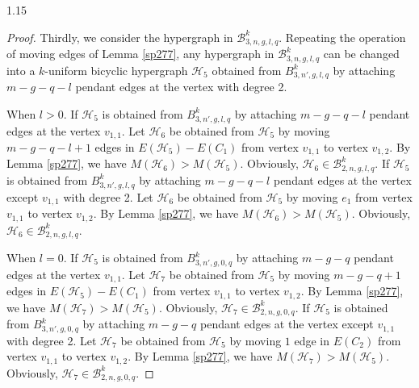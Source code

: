 \documentclass[preprint,12pt]{elsarticle1}
\numberwithin{equation}{section}
\begin{document}
\begin{spacing}{1.15}
\begin{proof}
Thirdly, we consider the hypergraph in $\mathcal{B}_{3,n,g,l,q}^{k}$. Repeating the operation of moving edges of Lemma \ref{sp277}, any hypergraph in $\mathcal{B}_{3,n,g,l,q}^{k}$ can be changed into a $k$-uniform bicyclic hypergraph $\mathcal{H}_{5}$ obtained from $B_{3,n',g,l,q}^{k}$ by attaching $m-g-q-l$ pendant edges at the vertex with degree 2.

When $l>0$. If $\mathcal{H}_{5}$ is obtained from $B_{3,n',g,l,q}^{k}$ by attaching $m-g-q-l$ pendant edges at the vertex $v_{1,1}$. Let $\mathcal{H}_{6}$
be obtained from $\mathcal{H}_{5}$ by moving $m-g-q-l+1$ edges in $E(\mathcal{H}_{5})-E(C_{1})$
from vertex $v_{1,1}$ to vertex $v_{1,2}$. By Lemma \ref{sp277}, we have $M(\mathcal{H}_{6})>M(\mathcal{H}_{5})$. Obviously, $\mathcal{H}_{6}\in \mathcal{B}_{2,n,g,l,q}^{k}.$
If $\mathcal{H}_{5}$ is obtained from $B_{3,n',g,l,q}^{k}$ by attaching $m-g-q-l$ pendant edges at the vertex except $v_{1,1}$ with degree 2. Let $\mathcal{H}_{6}$
be obtained from $\mathcal{H}_{5}$ by moving $e_{1}$
from vertex $v_{1,1}$ to vertex $v_{1,2}$. By Lemma \ref{sp277}, we have $M(\mathcal{H}_{6})>M(\mathcal{H}_{5})$. Obviously, $\mathcal{H}_{6}\in \mathcal{B}_{2,n,g,l,q}^{k}.$

%


When $l=0$.
If $\mathcal{H}_{5}$ is obtained from $B_{3,n',g,0,q}^{k}$ by attaching $m-g-q$ pendant edges at the vertex $v_{1,1}$. Let $\mathcal{H}_{7}$ be obtained from $\mathcal{H}_{5}$ by moving $m-g-q+1$ edges in $E(\mathcal{H}_{5})-E(C_{1})$
from vertex $v_{1,1}$ to vertex $v_{1,2}$. By Lemma \ref{sp277}, we have $M(\mathcal{H}_{7})>M(\mathcal{H}_{5})$. Obviously, $\mathcal{H}_{7}\in \mathcal{B}_{2,n,g,0,q}^{k}.$
If $\mathcal{H}_{5}$ is obtained from $B_{3,n',g,0,q}^{k}$ by attaching $m-g-q$ pendant edges at the vertex except $v_{1,1}$ with degree 2. Let $\mathcal{H}_{7}$ be obtained from $\mathcal{H}_{5}$ by moving $1$ edge in $E(C_{2})$
from vertex $v_{1,1}$ to vertex $v_{1,2}$. By Lemma \ref{sp277}, we have $M(\mathcal{H}_{7})>M(\mathcal{H}_{5})$. Obviously, $\mathcal{H}_{7}\in \mathcal{B}_{2,n,g,0,q}^{k}.$






\end{proof}
\end{spacing}
\end{document}
